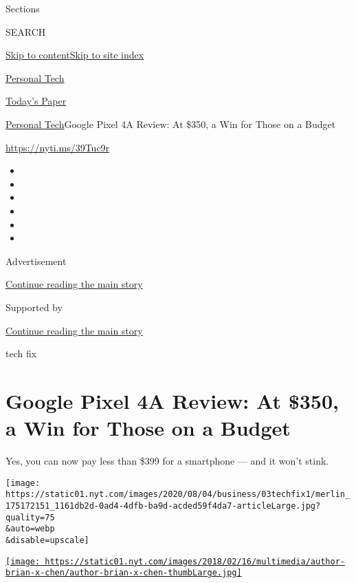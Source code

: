 Sections

SEARCH

\protect\hyperlink{site-content}{Skip to
content}\protect\hyperlink{site-index}{Skip to site index}

\href{https://www.nytimes.com/section/technology/personaltech}{Personal
Tech}

\href{https://myaccount.nytimes.com/auth/login?response_type=cookie\&client_id=vi}{}

\href{https://www.nytimes.com/section/todayspaper}{Today's Paper}

\href{/section/technology/personaltech}{Personal Tech}\textbar{}Google
Pixel 4A Review: At \$350, a Win for Those on a Budget

\url{https://nyti.ms/39Tuc9r}

\begin{itemize}
\item
\item
\item
\item
\item
\item
\end{itemize}

Advertisement

\protect\hyperlink{after-top}{Continue reading the main story}

Supported by

\protect\hyperlink{after-sponsor}{Continue reading the main story}

tech fix

\hypertarget{google-pixel-4a-review-at-350-a-win-for-those-on-a-budget}{%
\section{Google Pixel 4A Review: At \$350, a Win for Those on a
Budget}\label{google-pixel-4a-review-at-350-a-win-for-those-on-a-budget}}

Yes, you can now pay less than \$399 for a smartphone --- and it won't
stink.

\texttt{[image: https://static01.nyt.com/images/2020/08/04/business/03techfix1/merlin\_175172151\_1161db2d-0ad4-4dfb-ba9d-acded59f4da7-articleLarge.jpg?quality=75\\\&auto=webp\\\&disable=upscale]}

\href{https://www.nytimes.com/by/brian-x-chen}{\texttt{[image: https://static01.nyt.com/images/2018/02/16/multimedia/author-brian-x-chen/author-brian-x-chen-thumbLarge.jpg]}}

